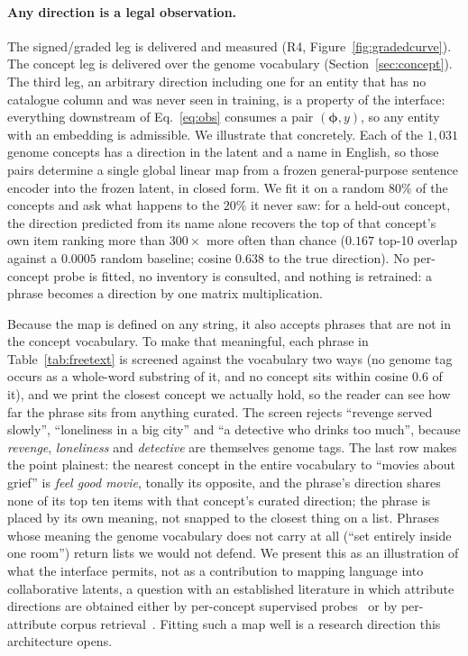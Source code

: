 \documentclass[manuscript,screen]{acmart}
\newcommand{\bphi}{\boldsymbol{\phi}}
\begin{document}
\paragraph{Any direction is a legal observation.} The signed/graded leg is delivered and measured (R4, Figure~\ref{fig:gradedcurve}). The concept leg is delivered over the genome vocabulary (Section~\ref{sec:concept}). The third leg, an arbitrary direction including one for an entity that has no catalogue column and was never seen in training, is a property of the interface: everything downstream of Eq.~\eqref{eq:obs} consumes a pair $(\bphi,y)$, so any entity with an embedding is admissible. We illustrate that concretely. Each of the $1{,}031$ genome concepts has a direction in the latent and a name in English, so those pairs determine a single global linear map from a frozen general-purpose sentence encoder into the frozen latent, in closed form. We fit it on a random $80\%$ of the concepts and ask what happens to the $20\%$ it never saw: for a held-out concept, the direction predicted from its name alone recovers the top of that concept's own item ranking more than $300\times$ more often than chance ($0.167$ top-10 overlap against a $0.0005$ random baseline; cosine $0.638$ to the true direction). No per-concept probe is fitted, no inventory is consulted, and nothing is retrained: a phrase becomes a direction by one matrix multiplication.

Because the map is defined on any string, it also accepts phrases that are not in the concept vocabulary. To make that meaningful, each phrase in Table~\ref{tab:freetext} is screened against the vocabulary two ways (no genome tag occurs as a whole-word substring of it, and no concept sits within cosine $0.6$ of it), and we print the closest concept we actually hold, so the reader can see how far the phrase sits from anything curated. The screen rejects ``revenge served slowly'', ``loneliness in a big city'' and ``a detective who drinks too much'', because \emph{revenge}, \emph{loneliness} and \emph{detective} are themselves genome tags. The last row makes the point plainest: the nearest concept in the entire vocabulary to ``movies about grief'' is \emph{feel good movie}, tonally its opposite, and the phrase's direction shares none of its top ten items with that concept's curated direction; the phrase is placed by its own meaning, not snapped to the closest thing on a list. Phrases whose meaning the genome vocabulary does not carry at all (``set entirely inside one room'') return lists we would not defend. We present this as an illustration of what the interface permits, not as a contribution to mapping language into collaborative latents, a question with an established literature in which attribute directions are obtained either by per-concept supervised probes~\citep{gopfert2024cav,biyik2023soft} or by per-attribute corpus retrieval~\citep{balog2021softattr}. Fitting such a map well is a research direction this architecture opens.
\end{document}
